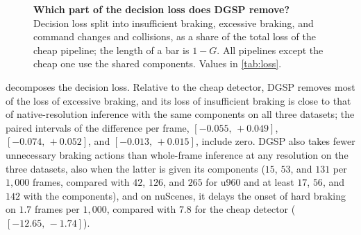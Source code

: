 \documentclass[10pt,letterpaper]{article}
\newcommand{\method}{DGSP\xspace}
\newcommand{\G}{G}
\newcommand{\ci}[2]{[#1,\allowbreak\,#2]}
\theoremstyle{remark}
\theoremstyle{plain}
\theoremstyle{definition}
\begin{document}
\begin{figure}[!htbp]
\vspace{2pt}
\caption{\textbf{Which part of the decision loss does \method remove?} Decision loss split into insufficient braking, excessive braking, and command changes and collisions, as a share of the total loss of the cheap pipeline; the length of a bar is $1-\G$. All pipelines except the cheap one use the shared components. Values in \cref{tab:loss}.}
\label{fig:loss}
\end{figure}

 decomposes the decision loss.
Relative to the cheap detector, \method removes most of the loss of excessive braking, and its loss of insufficient braking is close to that of native-resolution inference with the same components on all three datasets; the paired intervals of the difference per frame, $\ci{-0.055}{+0.049}$, $\ci{-0.074}{+0.052}$, and $\ci{-0.013}{+0.015}$, include zero.
\method also takes fewer unnecessary braking actions than whole-frame inference at any resolution on the three datasets, also when the latter is given its components ($15$, $53$, and $131$ per $1{,}000$ frames, compared with $42$, $126$, and $265$ for u960 and at least $17$, $56$, and $142$ with the components), and on nuScenes, it delays the onset of hard braking on $1.7$ frames per $1{,}000$, compared with $7.8$ for the cheap detector ($\ci{-12.65}{-1.74}$).
\end{document}
